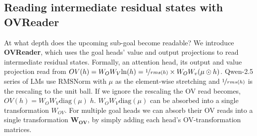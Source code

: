 


\subsection{Reading intermediate residual states with OVReader}
\label{sec:mechanism:upstream}

At what depth does the upcoming sub-goal become readable? We introduce \textbf{OVReader}, which uses the goal heads' value and output projections to read intermediate residual states. Formally, an attention head, its output and value projection read from $OV(h) = W_OW_V \mathrm{ln}(h) = \nicefrac{1}{rms(h)} \times W_OW_v(\mu \odot h)$. Qwen-2.5 series of LMs use $\mathrm{RMSNorm}$ with $\mu$ as the element-wise stretching and $\nicefrac{1}{rms(h)}$ is the rescaling to the unit ball. If we ignore the rescaling the OV read becomes, $OV(h) = W_OW_V\mathrm{diag}(\mu)\;h$. $W_OW_V\mathrm{diag}(\mu)$ can be absorbed into a single transformation $W_{OV}$. For multiple goal heads we can absorb their OV reads into a single transformation  $\mathbf{W_{OV}}$, by simply adding each head's OV-transformation matrices.

